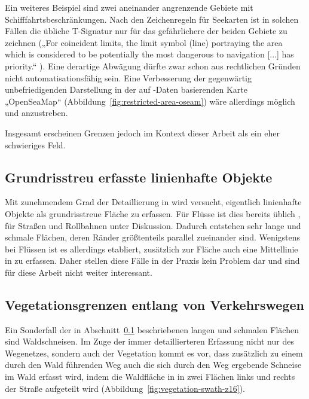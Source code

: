 \documentclass[../main/thesis.tex]{subfiles}
\begin{document}
Ein weiteres Beispiel sind zwei aneinander angrenzende Gebiete mit Schifffahrtsbeschränkungen.
Nach den Zeichenregeln für Seekarten ist in solchen Fällen die übliche T-Signatur  nur für das gefährlichere der beiden Gebiete zu zeichnen („For coincident limits, the limit symbol (line) portraying the area which is considered to be potentially the most dangerous to navigation [...] has priority.“ ).
Eine derartige Abwägung dürfte zwar schon aus rechtlichen Gründen nicht automatisationsfähig sein.
Eine Verbesserung der gegenwärtig unbefriedigenden Darstellung in der auf \osm-Daten basierenden Karte „OpenSeaMap“ (Abbildung~\ref{fig:restricted-area-oseam}) wäre allerdings möglich und anzustreben.

Insgesamt erscheinen Grenzen jedoch im Kontext dieser Arbeit als ein eher schwieriges Feld.


\subsection{Grundrisstreu erfasste linienhafte Objekte}
\label{ground-plan-linear-objects-case-desc}

Mit zunehmendem Grad der Detaillierung in \osm{} wird versucht, eigentlich linienhafte Objekte als grundrisstreue Fläche zu erfassen. Für Flüsse ist dies bereits üblich , für Straßen und Rollbahnen unter Diskussion.
Dadurch entstehen sehr lange und schmale Flächen, deren Ränder größtenteils parallel zueinander sind.
Wenigstens bei Flüssen ist es allerdings etabliert, zusätzlich zur Fläche auch eine Mittellinie in \osm{} zu erfassen.
Daher stellen diese Fälle in der Praxis kein Problem dar und sind für diese Arbeit nicht weiter interessant.


\subsection{Vegetationsgrenzen entlang von Verkehrswegen}

Ein Sonderfall der in Abschnitt~\ref{ground-plan-linear-objects-case-desc} beschriebenen langen und schmalen Flächen sind Waldschneisen.
Im Zuge der immer detaillierteren Erfassung nicht nur des Wegenetzes, sondern auch der Vegetation kommt es vor, dass zusätzlich zu einem durch den Wald führenden Weg auch die sich durch den Weg ergebende Schneise im Wald erfasst wird, indem die Waldfläche in \osm{} in zwei Flächen links und rechts der Straße aufgeteilt wird (Abbildung~\ref{fig:vegetation-swath-z16}).
\end{document}
